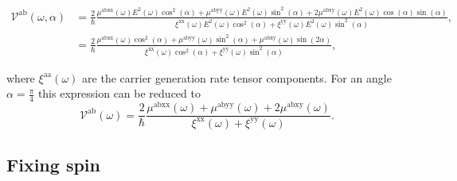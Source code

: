 \documentclass[prb,11pt,tightenlines,twocolumn,aps]{revtex4-1}
\begin{document}
\begin{widetext}
\begin{align}
\mathcal{V}^{\mathrm{ab}}(\omega,\alpha)
&= \frac{2}{\hbar}
\frac{\mu^{\mathrm{abxx}}(\omega)
E^{2}(\omega)\cos^{2}(\alpha) + 
\mu^{\mathrm{abyy}}(\omega)
E^{2}(\omega)\sin^{2}(\alpha) + 
2\mu^{\mathrm{abxy}}(\omega)
E^{2}(\omega)\cos(\alpha)\sin(\alpha)}
{\xi^{\mathrm{xx}}(\omega)
E^{2}(\omega)\cos^{2}(\alpha) + 
\xi^{\mathrm{yy}}(\omega)
E^{2}(\omega)\sin^{2}(\alpha)},
\nonumber \\
&= \frac{2}{\hbar}
\frac{\mu^{\mathrm{abxx}}(\omega)\cos^{2}(\alpha) + 
\mu^{\mathrm{abyy}}(\omega)\sin^{2}(\alpha) + 
\mu^{\mathrm{abxy}}(\omega)\sin(2\alpha)}
{\xi^{\mathrm{xx}}(\omega)\cos^{2}(\alpha) + 
\xi^{\mathrm{yy}}(\omega)\sin^{2}(\alpha)},
\label{eq:vab}
\end{align}
\end{widetext}
{\color{red}
where $\xi^{\mathrm{aa}}(\omega)$ are the carrier generation rate tensor
components\cite{arzatePRB14}.
}
% 
For an angle $\alpha = \frac{\pi}{4}$ this expression can be reduced to 
\begin{equation*}\label{eq:vab-90deg}
\mathcal{V}^{\mathrm{ab}} (\omega)
= \frac{2}{\hbar}
\frac{\mu^{\mathrm{abxx}}(\omega) + \mu^{\mathrm{abyy}}(\omega) + 
2\mu^{\mathrm{abxy}}(\omega)}
{\xi^{\mathrm{xx}}(\omega) + \xi^{\mathrm{yy}}(\omega)}.
\end{equation*}



\subsection{Fixing spin}\label{sec:theory-fixspin}
\end{document}
